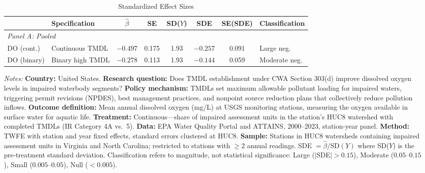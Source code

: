 \begin{table}[t]
\centering
\caption{Standardized Effect Sizes}
\label{tab:sde}
\footnotesize
\begin{tabular}{llcccccl}
\toprule
 & Specification & $\hat{\beta}$ & SE & SD($Y$) & SDE & SE(SDE) & Classification \\
\midrule
\multicolumn{8}{l}{\textit{Panel A: Pooled}} \\
DO (cont.) & Continuous TMDL & $-0.497$ & 0.175 & 1.93 & $-0.257$ & 0.091 & Large neg. \\
DO (binary) & Binary high TMDL & $-0.278$ & 0.113 & 1.93 & $-0.144$ & 0.059 & Moderate neg. \\
\bottomrule
\end{tabular}

\vspace{0.3em}
\begin{minipage}{\textwidth}
\footnotesize
\textit{Notes:}
\textbf{Country:} United States.
\textbf{Research question:} Does TMDL establishment under CWA Section 303(d) improve dissolved oxygen levels in impaired waterbody segments?
\textbf{Policy mechanism:} TMDLs set maximum allowable pollutant loading for impaired waters, triggering permit revisions (NPDES), best management practices, and nonpoint source reduction plans that collectively reduce pollution inflows.
\textbf{Outcome definition:} Mean annual dissolved oxygen (mg/L) at USGS monitoring stations, measuring the oxygen available in surface water for aquatic life.
\textbf{Treatment:} Continuous---share of impaired assessment units in the station's HUC8 watershed with completed TMDLs (IR Category 4A vs.\ 5).
\textbf{Data:} EPA Water Quality Portal and ATTAINS, 2000--2023, station-year panel.
\textbf{Method:} TWFE with station and year fixed effects, standard errors clustered at HUC8.
\textbf{Sample:} Stations in HUC8 watersheds containing impaired assessment units in Virginia and North Carolina; restricted to stations with $\geq$2 annual readings.
SDE $= \hat{\beta} / \text{SD}(Y)$ where SD($Y$) is the pre-treatment standard deviation. Classification refers to magnitude, not statistical significance: Large ($|$SDE$| > 0.15$), Moderate ($0.05$--$0.15$), Small ($0.005$--$0.05$), Null ($< 0.005$).
\end{minipage}
\end{table}

